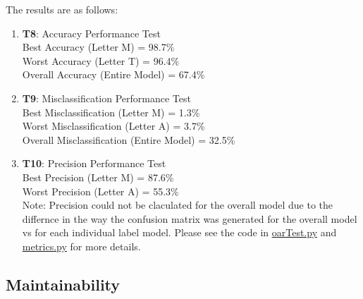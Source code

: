 \documentclass[12pt, titlepage]{article}
\begin{document}
The results are as follows:
\begin{enumerate}
  \item{\textbf{T8}: Accuracy Performance Test}\\
  Best Accuracy (Letter M) = 98.7\% \\
  Worst Accuracy (Letter T) = 96.4\% \\
  Overall Accuracy (Entire Model) = 67.4\% \\
  \item{\textbf{T9}: Misclassification Performance Test}\\
  Best Misclassification (Letter M) = 1.3\% \\
  Worst Misclassification (Letter A) = 3.7\% \\
  Overall Misclassification (Entire Model) = 32.5\% \\
  \item{\textbf{T10}: Precision Performance Test}\\
  Best Precision (Letter M) = 87.6\% \\
  Worst Precision  (Letter A) = 55.3\% \\
  Note: Precision could not be claculated for the overall model due to the differnce in the way the confusion matrix was generated for the overall model vs for each
  individual label model. Please see the code in \href{https://github.com/cer-hunter/OAR-CAS741/blob/main/src/oarTest.py}{oarTest.py} and \href{https://github.com/cer-hunter/OAR-CAS741/blob/main/src/oarTest.py}{metrics.py}
  for more details.\\
\end{enumerate}

\subsection{Maintainability}
\end{document}
